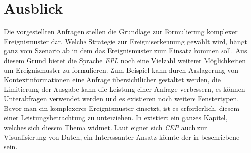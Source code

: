 \documentclass{acm_proc_article-sp}
\begin{document}
\section{Ausblick}
\vspace{0.1cm}
Die vorgestellten Anfragen stellen die Grundlage zur Formulierung komplexer 
Ereignismuster dar. Welche Strategie zur Ereigniserkennung gewählt wird, hängt ganz vom 
Szenario ab in dem das Ereignismuster zum Einsatz kommen soll. Aus diesem Grund bietet 
die Sprache \textit{EPL} noch eine Vielzahl weiterer Möglichkeiten um Ereignismuster zu 
formulieren. Zum Beispiel kann durch Auslagerung von Kontextinformationen eine Anfrage 
übersichtlicher gestaltet werden, die Limitierung der Ausgabe kann die Leistung einer 
Anfrage verbessern, es können Unterabfragen verwendet werden und es existieren noch 
weitere Fenstertypen.\\
Bevor man ein komplexeres Ereignismuster einsetzt, ist es erforderlich, diesem einer 
Leistungsbetrachtung zu unterziehen. In \cite{esper-reference} existiert ein ganzes 
Kapitel, welches sich diesem Thema widmet. Laut \cite{eckert} eignet sich \textit{CEP} 
auch zur Visualisierung von Daten, ein Interessanter Ansatz könnte der in \cite{perry} 
beschriebene sein.


\appendix
\vspace{0.1cm}
%

%
%

\end{document}
